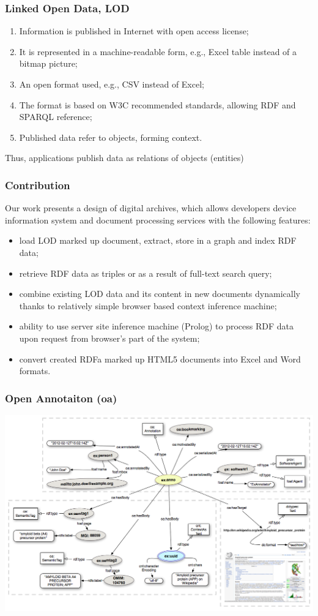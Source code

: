 \documentclass[10pt]{beamer}
\begin{document}
\begin{frame}
  \frametitle{Linked Open Data, LOD}
  \begin{enumerate}
  \item Information is published in Internet with open access license;
  \item It is represented in a machine-readable form, e.g., Excel table instead of a bitmap picture;
  \item An open format used, e.g., CSV instead of Excel;
  \item The format is based on W3C recommended standards, allowing RDF and SPARQL reference;
  \item Published data refer to objects, forming context.
  \end{enumerate}
  Thus, applications publish data as relations of objects (entities)
\end{frame}

\begin{frame}
  \frametitle{Contribution}
Our work presents a design of digital archives, which allows
developers device information system and document processing services
with the following features:
\begin{itemize}
\item load LOD marked up document, extract, store in a graph and index RDF data;
\item retrieve RDF data as triples or as a result of full-text search query;
\item combine existing LOD data and its content in new documents dynamically
  thanks to relatively simple browser based context inference machine;
\item ability to use server site inference machine (Prolog) to process RDF data upon
  request from browser's part of the system;
\item convert created RDFa marked up HTML5 documents into Excel and Word formats.
\end{itemize}
\end{frame}

\begin{frame}
  \frametitle{Open Annotaiton (oa)}
  \centering
  \includegraphics[width=1\linewidth]{Open-Annotation_CB_Bookmarking_and_Semantically_Tagging_A_webpage_spec20130128.png}

\end{frame}
\end{document}
